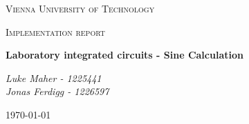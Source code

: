 
\begin{titlepage}
	\centering
	{\scshape\LARGE Vienna University of Technology \par}
	\vspace{1cm}
	{\scshape\Large Implementation report \par}
	\vspace{1.5cm}
	{\huge\bfseries Laboratory integrated circuits - Sine Calculation \par}
	\vspace{2cm}
	{\Large\itshape Luke Maher - 1225441 \\ Jonas Ferdigg - 1226597 \par}
	\vfill

	{\large \today\par}
\end{titlepage}

